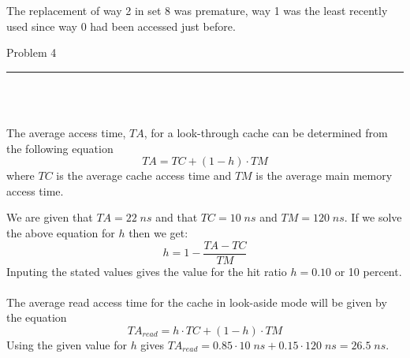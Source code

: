 \documentclass[11pt,reqno]{article}
\begin{document}
The replacement of way 2 in set 8 was premature, way 1 was the least recently used since way 0 had been accessed just before.
\newpage

\begin{flushleft} 
Problem 4 \\
\rule{500pt}{1pt}\\
\end{flushleft} 

\noindent{}\\ 

The average access time, $TA$, for a look-through cache can be determined from the following equation
\[ TA =  TC  + (1 - h) \cdot TM\]
where $TC$ is the average cache access time and $TM$ is the average main memory access time.

We are given that $TA = 22 \; ns$ and that $TC = 10 \; ns$ and $TM = 120 \; ns$. If we solve the above equation for $h$ then we get:
\[ h = 1- \frac{TA - TC}{TM} \]
Inputing the stated values gives the value for the hit ratio $h = 0.10$ or 10 percent.\\

\noindent{}\\ 

The average read access time for the cache in look-aside mode will be given by the equation
\[ TA_{read} =  h \cdot TC  + (1 - h) \cdot TM\]
Using the given value for $h$ gives $TA_{read} = 0.85 \cdot 10 \; ns + 0.15 \cdot 120 \; ns = 26.5 \; ns$.
\end{document}
